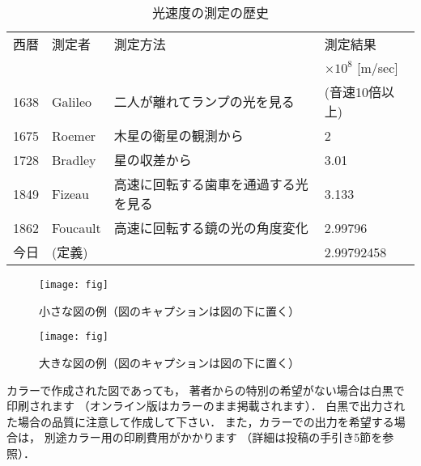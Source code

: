 \documentclass[main]{subfiles}
\begin{document}
        \begin{table*}[t]
            \caption{光速度の測定の歴史}
            \label{table:SpeedOfLight}
            \begin{center}
                \begin{tabular}{clll}\hline
                    西暦   & 測定者      & 測定方法               & 測定結果                  \\
                         &          &                    & $\times 10^8$ [m/sec] \\
                    \hline \hline
                    1638 & Galileo  & 二人が離れてランプの光を見る     & (音速10倍以上)             \\
                    1675 & Roemer   & 木星の衛星の観測から         & 2                     \\
                    1728 & Bradley  & 星の収差から             & 3.01                  \\
                    1849 & Fizeau   & 高速に回転する歯車を通過する光を見る & 3.133                 \\
                    1862 & Foucault & 高速に回転する鏡の光の角度変化    & 2.99796               \\
                    今日   & (定義)     &                    & 2.99792458            \\
                    \hline
                \end{tabular}
            \end{center}
        \end{table*}
    
        \begin{figure}[hb]
            \begin{center}
                \texttt{[image: fig]}
            \end{center}
            \caption{小さな図の例（図のキャプションは図の下に置く）}%
            \label{小さな図}
        \end{figure}
    
        \begin{figure*}[t]
            \begin{center}
                \texttt{[image: fig]}
            \end{center}
            \caption{大きな図の例（図のキャプションは図の下に置く）}%
            \label{大きな図}
        \end{figure*}
    
        カラーで作成された図であっても，
        著者からの特別の希望がない場合は白黒で印刷されます
        （オンライン版はカラーのまま掲載されます）．
        白黒で出力された場合の品質に注意して作成して下さい．
        また，カラーでの出力を希望する場合は，
        別途カラー用の印刷費用がかかります
        （詳細は投稿の手引き5節を参照）．
    
\end{document}
